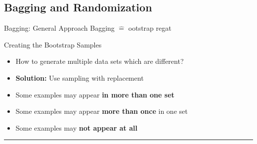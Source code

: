 \subsection{Bagging and Randomization}

\begin{frame}{Bagging: General Approach}{}\important
	\vspace*{1.5mm}
	Bagging $\widehat{=}$ ootstrap regat
	\vspace*{-2mm}
	
\end{frame}


\begin{frame}{Creating the Bootstrap Samples}{}
	\begin{itemize}
		\item How to generate multiple data sets which are different?
		\item \textbf{Solution:} Use sampling with replacement
		\vspace*{2mm}
		
		\vspace*{2mm}
		\item Some examples may appear \textbf{in more than one set}
		\item Some examples may appear \textbf{more than once} in one set
		\item Some examples may \textbf{not appear at all}
	\end{itemize}
\end{frame}


\begin{frame}[plain]{}{}
	\begin{algorithm}[H]
		\DontPrintSemicolon
		\footnotesize
		\;
		\hrule
		\;
 		\caption{Bagging Algorithm}
	\end{algorithm}
\end{frame}


